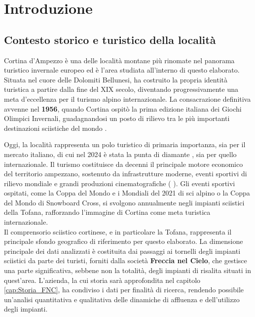 \chapter{Introduzione}
\label{cha:Introduzione}



\section{Contesto storico e turistico della località}\label{par:Contesto_storico}

Cortina d’Ampezzo è una delle località montane più rinomate nel panorama turistico invernale europeo ed è l'area studiata all'interno di questo elaborato. Situata nel cuore delle Dolomiti Bellunesi, ha costruito la propria identità turistica a partire dalla fine del XIX secolo, diventando progressivamente una meta d’eccellenza per il turismo alpino internazionale. La consacrazione definitiva avvenne nel \textbf{1956}, quando Cortina ospitò la prima edizione italiana dei Giochi Olimpici Invernali, guadagnandosi un posto di rilievo tra le più importanti destinazioni sciistiche del mondo \cite{In_focus_HVS}.

Oggi, la località rappresenta un polo turistico di primaria importanza, sia per il mercato italiano, di cui nel 2024 è stata la punta di diamante \cite{Cronaca2024VacanzeNeve}, sia per quello internazionale. Il turismo costituisce da decenni il principale motore economico del territorio ampezzano, sostenuto da infrastrutture moderne, eventi sportivi di rilievo mondiale e grandi produzioni cinematografiche (\cite{Only_for_your_eyes} \cite{Vacanze_di_Natale} \cite{Vacanze_di_Natale_a_Cortina}). Gli eventi sportivi ospitati, come la Coppa del Mondo e i Mondiali del 2021 di sci alpino o la Coppa del Mondo di Snowboard Cross, si svolgono annualmente negli impianti sciistici della Tofana, rafforzando l'immagine di Cortina come meta turistica internazionale.\\

Il comprensorio sciistico cortinese, e in particolare la Tofana, rappresenta il principale sfondo geografico di riferimento per questo elaborato. La dimensione principale dei dati analizzati è costituita dai passaggi ai tornelli degli impianti sciistici da parte dei turisti, forniti dalla società \textbf{Freccia nel Cielo}, che gestisce una parte significativa, sebbene non la totalità, degli impianti di risalita situati in quest'area. L'azienda, la cui storia sarà approfondita nel capitolo \ref{cap:Storia_FNC}, ha condiviso i dati per finalità di ricerca, rendendo possibile un'analisi quantitativa e qualitativa delle dinamiche di affluenza e dell'utilizzo degli impianti.\\

